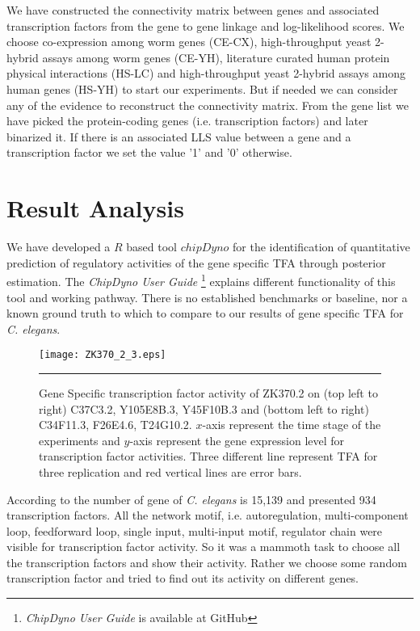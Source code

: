 We have constructed the connectivity matrix between genes and associated transcription factors from the gene to gene linkage and log-likelihood scores. We choose co-expression among worm genes (CE-CX), high-throughput yeast 2-hybrid assays among worm genes (CE-YH), literature curated human protein physical interactions (HS-LC) and high-throughput yeast 2-hybrid assays among human genes (HS-YH) to start our experiments. But if needed we can consider any of the evidence to reconstruct the connectivity matrix. From the gene list we have picked the protein-coding genes (i.e. transcription factors) and later 
binarized it. If there is an associated LLS value between a gene and a transcription factor we set the value '1' and '0' otherwise.

\section{Result Analysis}
We have developed a $R$ based tool $chipDyno$ for the identification of quantitative prediction of regulatory activities of the gene specific TFA through posterior estimation. The \textit{ChipDyno User Guide} \footnote{\textit{ChipDyno User Guide} is available at GitHub} explains different functionality of this tool and working pathway. There is no established benchmarks or baseline, nor a known ground truth to which to compare to our results of gene specific TFA for \textit{C. elegans}.

\begin{figure}
	\centering
		\texttt{[image: ZK370\_2\_3.eps]}
		\rule{35em}{0.5pt}
	\caption[Gene Specific transcription factor activity of ZK370.2]
		{Gene Specific transcription factor activity of ZK370.2 on (top left to right) C37C3.2, Y105E8B.3, Y45F10B.3 and (bottom left to right) C34F11.3, F26E4.6, T24G10.2. $x$-axis represent the time stage of the experiments and $y$-axis represent the gene expression level for transcription factor activities. Three different line represent TFA for three replication and red vertical lines are error bars.}
	\label{fig:TFA_of_of_ZK370.2}
\end{figure}

According to \cite{WormNet} the number of gene of \textit{C. elegans} is 15,139 and \cite{Inmaculada:2007} presented 934 transcription factors. All the network motif, i.e. autoregulation, multi-component loop, feedforward loop, single input, multi-input motif, regulator chain were visible for transcription factor activity. So it was a mammoth task to choose all the transcription factors and show their activity. Rather we choose some random transcription factor and tried to find out its activity on different genes.

